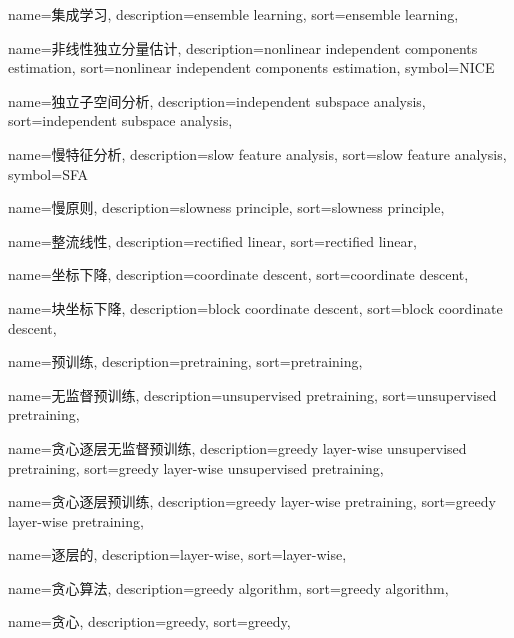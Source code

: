 {
  name=集成学习,
  description={ensemble learning},
  sort={ensemble learning},
}

{
  name=非线性独立分量估计,
  description={nonlinear independent components estimation},
  sort={nonlinear independent components estimation},
  symbol={NICE}
}

{
  name=独立子空间分析,
  description={independent subspace analysis},
  sort={independent subspace analysis},
}

{
  name=慢特征分析,
  description={slow feature analysis},
  sort={slow feature analysis},
  symbol={SFA}
}

{
  name=慢原则,
  description={slowness principle},
  sort={slowness principle},
}

{
  name=整流线性,
  description={rectified linear},
  sort={rectified linear},
}

{
  name=坐标下降,
  description={coordinate descent},
  sort={coordinate descent},
}

{
  name=块坐标下降,
  description={block coordinate descent},
  sort={block coordinate descent},
}

{
  name=预训练,
  description={pretraining},
  sort={pretraining},
}

{
  name=无监督预训练,
  description={unsupervised pretraining},
  sort={unsupervised pretraining},
}

{
  name=贪心逐层无监督预训练,
  description={greedy layer-wise unsupervised pretraining},
  sort={greedy layer-wise unsupervised pretraining},
}

{
  name=贪心逐层预训练,
  description={greedy layer-wise pretraining},
  sort={greedy layer-wise pretraining},
}

{
  name=逐层的,
  description={layer-wise},
  sort={layer-wise},
}

{
  name=贪心算法,
  description={greedy algorithm},
  sort={greedy algorithm},
}

{
  name=贪心,
  description={greedy},
  sort={greedy},
}

